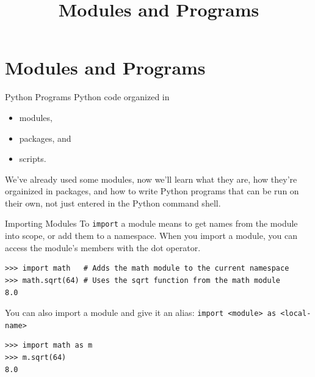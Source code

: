 \documentclass[smaller, aspectratio=1610]{beamer}
\date{}
\title{Modules and Programs}
\begin{document}
\maketitle

\section{Modules and Programs}
\label{sec:org35365e3}

\begin{frame}[label={sec:org2183131}]{Python Programs}
Python code organized in

\begin{itemize}
\item modules,
\item packages, and
\item scripts.
\end{itemize}

We've already used some modules, now we'll learn what they are, how they're orgainized in packages, and how to write Python programs that can be run on their own, not just entered in the Python command shell.
\end{frame}

\begin{frame}[label={sec:org8eb6f8b},fragile]{Importing Modules}
 To \texttt{import} a module means to get names from the module into scope, or add them to a namespace. When you import a module, you can access the module's members with the dot operator.

\lstset{language=Python,label= ,caption= ,captionpos=b,numbers=none}
\begin{lstlisting}
>>> import math   # Adds the math module to the current namespace
>>> math.sqrt(64) # Uses the sqrt function from the math module
8.0
\end{lstlisting}

You can  also import a module and give it an alias: \texttt{import <module> as <local-name>}

\lstset{language=Python,label= ,caption= ,captionpos=b,numbers=none}
\begin{lstlisting}
>>> import math as m
>>> m.sqrt(64)
8.0
\end{lstlisting}
\end{frame}
\end{document}
